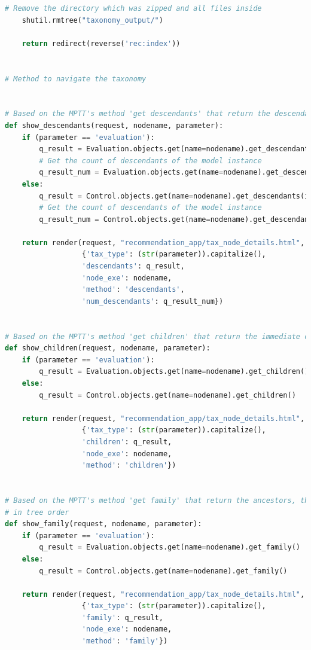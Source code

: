 \begin{lstlisting}[language=Python, caption={Parti principali del codice delle View della soluzione per gestire la navigazione 
    delle tassonomie, quella delle Evaluation e quella dei Controlli}]
    # Remove the directory which was zipped and all files inside
    shutil.rmtree("taxonomy_output/")
 
    return redirect(reverse('rec:index'))


# Method to navigate the taxonomy


# Based on the MPTT's method 'get descendants' that return the descendants of a model instance, in tree order
def show_descendants(request, nodename, parameter):
    if (parameter == 'evaluation'):
        q_result = Evaluation.objects.get(name=nodename).get_descendants(include_self=False)
        # Get the count of descendants of the model instance
        q_result_num = Evaluation.objects.get(name=nodename).get_descendant_count()
    else:
        q_result = Control.objects.get(name=nodename).get_descendants(include_self=False)
        # Get the count of descendants of the model instance
        q_result_num = Control.objects.get(name=nodename).get_descendant_count()
    
    return render(request, "recommendation_app/tax_node_details.html",
                  {'tax_type': (str(parameter)).capitalize(),
                  'descendants': q_result,
                  'node_exe': nodename,
                  'method': 'descendants',
                  'num_descendants': q_result_num})


# Based on the MPTT's method 'get children' that return the immediate children of a model instance, in tree order
def show_children(request, nodename, parameter):
    if (parameter == 'evaluation'):
        q_result = Evaluation.objects.get(name=nodename).get_children()
    else:
        q_result = Control.objects.get(name=nodename).get_children()
    
    return render(request, "recommendation_app/tax_node_details.html",
                  {'tax_type': (str(parameter)).capitalize(),
                  'children': q_result,
                  'node_exe': nodename,
                  'method': 'children'})


# Based on the MPTT's method 'get family' that return the ancestors, the model instance itself and the descendants,
# in tree order
def show_family(request, nodename, parameter):
    if (parameter == 'evaluation'):
        q_result = Evaluation.objects.get(name=nodename).get_family()
    else:
        q_result = Control.objects.get(name=nodename).get_family()

    return render(request, "recommendation_app/tax_node_details.html",
                  {'tax_type': (str(parameter)).capitalize(),
                  'family': q_result,
                  'node_exe': nodename,
                  'method': 'family'})



\end{lstlisting}
